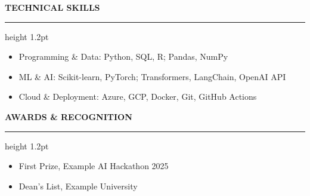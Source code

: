 \documentclass[10pt]{article}
\newcommand{\sectionrule}{\vspace{2pt}\hrule height 1.2pt\vspace{6pt}}
\newcommand{\resumesection}[1]{{\large\textbf{\MakeUppercase{#1}}}\sectionrule}
\begin{document}
\vspace{8pt}
\resumesection{Technical Skills}
\vspace{0.6em}
\begin{itemize}
  \item Programming \& Data: Python, SQL, R; Pandas, NumPy
  \item ML \& AI: Scikit-learn, PyTorch; Transformers, LangChain, OpenAI API
  \item Cloud \& Deployment: Azure, GCP, Docker, Git, GitHub Actions
\end{itemize}

\vspace{8pt}
\resumesection{Awards \& Recognition}
\vspace{0.6em}
\begin{itemize}
  \item First Prize, Example AI Hackathon 2025
  \item Dean's List, Example University
\end{itemize}
\end{document}
